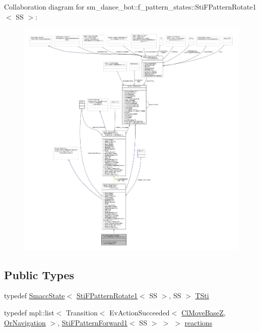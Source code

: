 Collaboration diagram for sm\+\_\+dance\+\_\+bot\+:\+:f\+\_\+pattern\+\_\+states\+:\+:Sti\+F\+Pattern\+Rotate1$<$ SS $>$\+:
\nopagebreak
\begin{figure}[H]
\begin{center}
\leavevmode
\includegraphics[width=350pt]{structsm__dance__bot_1_1f__pattern__states_1_1StiFPatternRotate1__coll__graph}
\end{center}
\end{figure}
\subsection*{Public Types}
\begin{DoxyCompactItemize}
\item 
typedef \hyperlink{classSmaccState}{Smacc\+State}$<$ \hyperlink{structsm__dance__bot_1_1f__pattern__states_1_1StiFPatternRotate1}{Sti\+F\+Pattern\+Rotate1}$<$ SS $>$, SS $>$ \hyperlink{structsm__dance__bot_1_1f__pattern__states_1_1StiFPatternRotate1_a3fafd58718e0f6aada113795bdf2c841}{T\+Sti}
\item 
typedef mpl\+::list$<$ Transition$<$ Ev\+Action\+Succeeded$<$ \hyperlink{classmove__base__z__client_1_1ClMoveBaseZ}{Cl\+Move\+BaseZ}, \hyperlink{classsm__dance__bot_1_1OrNavigation}{Or\+Navigation} $>$, \hyperlink{structsm__dance__bot_1_1f__pattern__states_1_1StiFPatternForward1}{Sti\+F\+Pattern\+Forward1}$<$ SS $>$ $>$ $>$ \hyperlink{structsm__dance__bot_1_1f__pattern__states_1_1StiFPatternRotate1_a7251b025614a0119a968d40c928ffd59}{reactions}
\end{DoxyCompactItemize}
